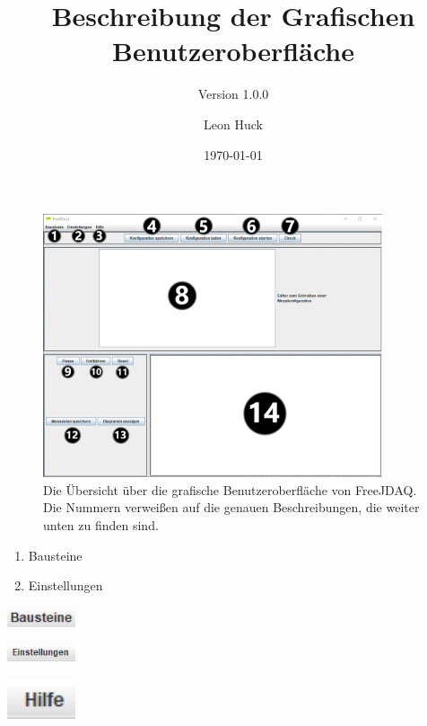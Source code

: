 \documentclass[parskip=full]{scrartcl}
\title{Beschreibung der Grafischen Benutzeroberfläche}
\subtitle{Version 1.0.0}
\author{Leon Huck}
\date{\today}
\begin{document}

\begin{figure}[htbp]
    \begin{center}
        \includegraphics[width = 10cm]{Grafiken/Uebersicht_GUI_Mit_Nummern.png}
        \caption{Die Übersicht über die grafische Benutzeroberfläche von FreeJDAQ. Die Nummern verweißen auf die genauen Beschreibungen, die weiter unten zu finden sind.}
        \label{Uebersicht_GUI_Mit_Nummern}
    \end{center}
\end{figure}

\begin{enumerate}
    \item Bausteine
    
    \item Einstellungen
\end{enumerate}

\begin{flushleft}
    \includegraphics[width = 2cm]{Grafiken/1-Bausteine.png}
\end{flushleft}

\begin{flushleft}
    \includegraphics[width = 2cm]{Grafiken/2-Einstellungen.png}
\end{flushleft}

\begin{flushleft}
    \includegraphics[width = 2cm]{Grafiken/3-Hilfe.png}
\end{flushleft}
\end{document}
